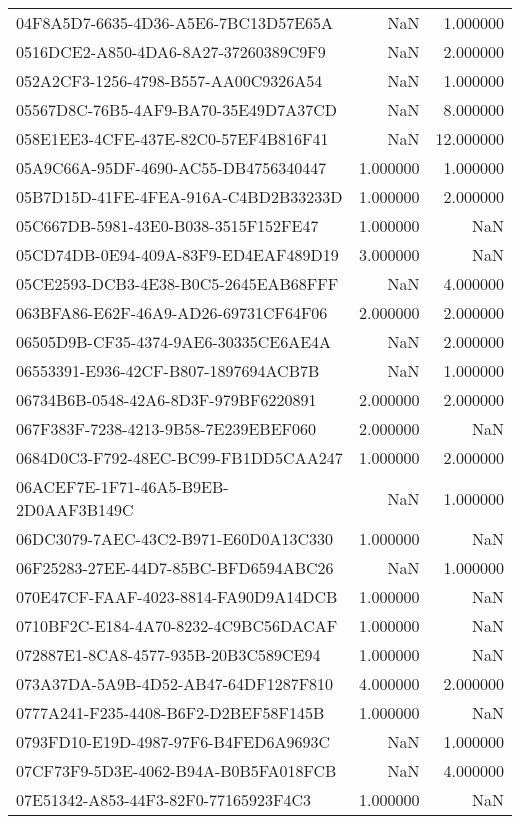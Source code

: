 \begin{tabular}{lrr}
04F8A5D7-6635-4D36-A5E6-7BC13D57E65A & NaN & 1.000000 \\
0516DCE2-A850-4DA6-8A27-37260389C9F9 & NaN & 2.000000 \\
052A2CF3-1256-4798-B557-AA00C9326A54 & NaN & 1.000000 \\
05567D8C-76B5-4AF9-BA70-35E49D7A37CD & NaN & 8.000000 \\
058E1EE3-4CFE-437E-82C0-57EF4B816F41 & NaN & 12.000000 \\
05A9C66A-95DF-4690-AC55-DB4756340447 & 1.000000 & 1.000000 \\
05B7D15D-41FE-4FEA-916A-C4BD2B33233D & 1.000000 & 2.000000 \\
05C667DB-5981-43E0-B038-3515F152FE47 & 1.000000 & NaN \\
05CD74DB-0E94-409A-83F9-ED4EAF489D19 & 3.000000 & NaN \\
05CE2593-DCB3-4E38-B0C5-2645EAB68FFF & NaN & 4.000000 \\
063BFA86-E62F-46A9-AD26-69731CF64F06 & 2.000000 & 2.000000 \\
06505D9B-CF35-4374-9AE6-30335CE6AE4A & NaN & 2.000000 \\
06553391-E936-42CF-B807-1897694ACB7B & NaN & 1.000000 \\
06734B6B-0548-42A6-8D3F-979BF6220891 & 2.000000 & 2.000000 \\
067F383F-7238-4213-9B58-7E239EBEF060 & 2.000000 & NaN \\
0684D0C3-F792-48EC-BC99-FB1DD5CAA247 & 1.000000 & 2.000000 \\
06ACEF7E-1F71-46A5-B9EB-2D0AAF3B149C & NaN & 1.000000 \\
06DC3079-7AEC-43C2-B971-E60D0A13C330 & 1.000000 & NaN \\
06F25283-27EE-44D7-85BC-BFD6594ABC26 & NaN & 1.000000 \\
070E47CF-FAAF-4023-8814-FA90D9A14DCB & 1.000000 & NaN \\
0710BF2C-E184-4A70-8232-4C9BC56DACAF & 1.000000 & NaN \\
072887E1-8CA8-4577-935B-20B3C589CE94 & 1.000000 & NaN \\
073A37DA-5A9B-4D52-AB47-64DF1287F810 & 4.000000 & 2.000000 \\
0777A241-F235-4408-B6F2-D2BEF58F145B & 1.000000 & NaN \\
0793FD10-E19D-4987-97F6-B4FED6A9693C & NaN & 1.000000 \\
07CF73F9-5D3E-4062-B94A-B0B5FA018FCB & NaN & 4.000000 \\
07E51342-A853-44F3-82F0-77165923F4C3 & 1.000000 & NaN \\

\end{tabular}
